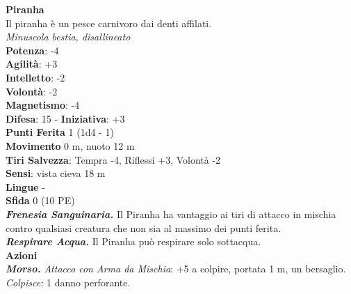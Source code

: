 \begin{multicols}{2}
\medskip\textbf{Piranha}\\
Il piranha è un pesce carnivoro dai denti affilati.\\
\emph{Minuscola bestia, disallineato}\\
\textbf{Potenza}: -4\\
\textbf{Agilità}: +3\\
\textbf{Intelletto}: -2\\
\textbf{Volontà}: -2\\
\textbf{Magnetismo}: -4\\
\textbf{Difesa}: 15 - \textbf{Iniziativa}: +3\\
\textbf{Punti Ferita} 1 (1d4 - 1)\\
\textbf{Movimento} 0 m, nuoto 12 m\\
\textbf{Tiri Salvezza}: Tempra -4, Riflessi +3, Volontà -2 \\
\textbf{Sensi}: vista cieva 18 m\\
\textbf{Lingue} -\\
\textbf{Sfida} 0 (10 PE)\smallskip\\
\emph{\textbf{Frenesia Sanguinaria.}} Il Piranha ha vantaggio ai tiri di attacco in mischia contro qualsiasi creatura che non sia al massimo dei punti ferita.\\
\emph{\textbf{Respirare Acqua.}} Il Piranha può respirare solo sottacqua.\\ \smallskip\textbf{Azioni}\\
\emph{\textbf{Morso.} Attacco con Arma da Mischia}: +5 a colpire, portata 1 m, un bersaglio.
\emph{Colpisce:} 1 danno perforante.\\


\end{multicols}
